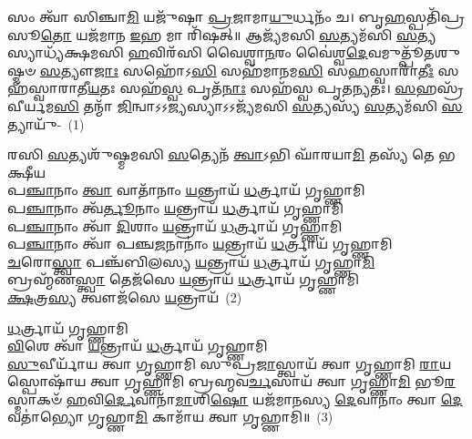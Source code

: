 {\anuvakamend[{𑌦𑌿\-\ul{𑌵𑌾} 𑌸 𑌸᳴\-\ul{𑌹}\-𑌸𑍍𑌰𑌿\-\ul{𑌣𑌂} 𑌵𑍈𑌶𑍍𑌵𑌾᳴𑌨𑌰𑌾\-𑌽\-𑌽𑌦𑌿\-\ul{𑌤𑍍𑌯} 𑌤𑍂 𑌨𑍋᳴\-𑌽\-\ul{𑌨𑍇}\-𑌹𑌸𑍞᳴ \ul{𑌸𑍁}\-𑌶𑌰𑍍𑌮𑌾᳴\-\ul{𑌣}\-𑌮𑍇\-\ul{𑌕𑌾}\-𑌨𑍍𑌨𑌵𑌿𑍞᳴\-\ul{𑌶}\-𑌤𑌿𑌶𑍍𑌚᳴}]}%

\setcounter{anuvakam}{0}
𑌸𑌂 𑌤𑍍𑌵𑌾᳴ 𑌸𑌿𑌞𑍍𑌚𑌾\-\ul{𑌮𑌿} 𑌯𑌜𑍁᳴𑌷𑌾 \ul{𑌪𑍍𑌰}\-𑌜𑌾𑌮𑌾\-\ul{𑌯𑍁}\-𑌰𑍍𑌧𑌨𑌂᳴ 𑌚। 𑌬𑍃\-\ul{𑌹}\-𑌸𑍍𑌪𑌤𑌿᳴𑌪𑍍𑌰𑌸𑍂\-\ul{𑌤𑍋} 𑌯𑌜᳴𑌮𑌾𑌨 \ul{𑌇}\-𑌹 𑌮𑌾 𑌰𑌿᳴𑌷𑌤𑍍॥ 𑌆𑌜𑍍𑌯᳴𑌮𑌸𑌿 \ul{𑌸}\-𑌤𑍍𑌯𑌮᳴𑌸𑌿 \ul{𑌸}\-𑌤𑍍𑌯𑌸𑍍𑌯𑌾𑌧𑍍𑌯᳴𑌕𑍍𑌷𑌮𑌸𑌿 \ul{𑌹}\-𑌵𑌿𑌰᳴𑌸𑌿 𑌵𑍈𑌶𑍍𑌵𑌾\-\ul{𑌨}\-𑌰𑌂 𑌵𑍈॑𑌶𑍍𑌵\-\ul{𑌦𑍇}\-𑌵𑌮𑍁𑌤𑍍𑌪𑍂᳴𑌤𑌶𑍁𑌷𑍍𑌮𑍞 \ul{𑌸}\-𑌤𑍍𑌯𑍗\-\ul{𑌜𑌾𑌃} 𑌸𑌹𑍋᳴\-𑌽\-\ul{𑌸𑌿} 𑌸𑌹᳴𑌮𑌾𑌨𑌮\-\ul{𑌸𑌿} 𑌸\-\ul{𑌹}\-𑌸𑍍𑌵𑌾𑌰𑌾᳴\-\ul{𑌤𑍀𑌃} 𑌸𑌹᳴𑌸𑍍𑌵𑌾𑌰𑌾𑌤𑍀\-\ul{𑌯}\-𑌤𑌃 𑌸𑌹᳴\-\ul{𑌸𑍍𑌵} 𑌪𑍃𑌤᳴\-\ul{𑌨𑌾𑌃} 𑌸𑌹᳴𑌸𑍍𑌵 𑌪𑍃𑌤\-\ul{𑌨𑍍𑌯}\-𑌤𑌃। \ul{𑌸}\-𑌹𑌸𑍍𑌰᳴𑌵𑍀𑌰𑍍𑌯𑌮\-\ul{𑌸𑌿} 𑌤𑌨𑍍𑌮𑌾᳴ \ul{𑌜𑌿}\-𑌨𑍍𑌵𑌾\-𑌽\-𑌽\-\ul{𑌜𑍍𑌯}\-𑌸𑍍𑌯𑌾\-𑌽\-𑌽𑌜𑍍𑌯᳴𑌮𑌸𑌿 \ul{𑌸}\-𑌤𑍍𑌯𑌸𑍍𑌯᳴ \ul{𑌸}\-𑌤𑍍𑌯𑌮᳴𑌸𑌿 \ul{𑌸}\-𑌤𑍍𑌯𑌾𑌯𑍁᳴-~(1)

𑌰𑌸𑌿 \ul{𑌸}\-𑌤𑍍𑌯𑌶𑍁᳴𑌷𑍍𑌮𑌮𑌸𑌿 \ul{𑌸}\-𑌤𑍍𑌯𑍇𑌨᳴ \ul{𑌤𑍍𑌵𑌾}\-\-𑌽𑌭𑌿 𑌘𑌾᳴𑌰𑌯𑌾\-\ul{𑌮𑌿} 𑌤𑌸𑍍𑌯᳴ 𑌤𑍇 𑌭𑌕𑍍𑌷𑍀𑌯\\
𑌪\-\ul{𑌞𑍍𑌚𑌾}\-𑌨𑌾𑌂 \ul{𑌤𑍍𑌵𑌾} 𑌵𑌾𑌤𑌾᳴𑌨𑌾𑌂 \ul{𑌯}\-𑌨𑍍𑌤𑍍𑌰𑌾𑌯᳴ \ul{𑌧}\-𑌰𑍍𑌤𑍍𑌰𑌾𑌯᳴ 𑌗𑍃𑌹𑍍𑌣𑌾𑌮𑌿\\
𑌪\-\ul{𑌞𑍍𑌚𑌾}\-𑌨𑌾𑌂 𑌤𑍍𑌵᳴\-\ul{𑌰𑍍𑌤𑍂}\-𑌨𑌾𑌂 \ul{𑌯}\-𑌨𑍍𑌤𑍍𑌰𑌾𑌯᳴ \ul{𑌧}\-𑌰𑍍𑌤𑍍𑌰𑌾𑌯᳴ 𑌗𑍃𑌹𑍍𑌣𑌾𑌮𑌿\\
𑌪\-\ul{𑌞𑍍𑌚𑌾}\-𑌨𑌾𑌂 𑌤𑍍𑌵𑌾᳴ \ul{𑌦𑌿}\-𑌶𑌾𑌂 \ul{𑌯}\-𑌨𑍍𑌤𑍍𑌰𑌾𑌯᳴ \ul{𑌧}\-𑌰𑍍𑌤𑍍𑌰𑌾𑌯᳴ 𑌗𑍃𑌹𑍍𑌣𑌾𑌮𑌿\\
𑌪\-\ul{𑌞𑍍𑌚𑌾}\-𑌨𑌾𑌂 𑌤𑍍𑌵𑌾᳴ 𑌪𑌞𑍍𑌚\-\ul{𑌜}\-𑌨𑌾𑌨𑌾𑌂॑ \ul{𑌯}\-𑌨𑍍𑌤𑍍𑌰𑌾𑌯᳴ \ul{𑌧}\-𑌰𑍍𑌤𑍍𑌰𑌾𑌯᳴ 𑌗𑍃𑌹𑍍𑌣𑌾𑌮𑌿\\
\-\ul{𑌚}\-𑌰𑍋\-\ul{𑌸𑍍𑌤𑍍𑌵𑌾} 𑌪𑌞𑍍𑌚᳴𑌬𑌿𑌲𑌸𑍍𑌯 \ul{𑌯}\-𑌨𑍍𑌤𑍍𑌰𑌾𑌯᳴ \ul{𑌧}\-𑌰𑍍𑌤𑍍𑌰𑌾𑌯᳴ 𑌗𑍃𑌹𑍍𑌣𑌾\-\ul{𑌮𑌿}\-\\
𑌬𑍍𑌰𑌹𑍍𑌮᳴𑌣\-\ul{𑌸𑍍𑌤𑍍𑌵𑌾} 𑌤𑍇𑌜᳴𑌸𑍇 \ul{𑌯}\-𑌨𑍍𑌤𑍍𑌰𑌾𑌯᳴ \ul{𑌧}\-𑌰𑍍𑌤𑍍𑌰𑌾𑌯᳴ 𑌗𑍃𑌹𑍍𑌣𑌾𑌮𑌿\\
\-\ul{𑌕𑍍𑌷}\-𑌤𑍍𑌰\-\ul{𑌸𑍍𑌯} 𑌤𑍍𑌵𑍗𑌜᳴𑌸𑍇 \ul{𑌯}\-𑌨𑍍𑌤𑍍𑌰𑌾𑌯᳴~(2)

\-\ul{𑌧}\-𑌰𑍍𑌤𑍍𑌰𑌾𑌯᳴ 𑌗𑍃𑌹𑍍𑌣𑌾𑌮𑌿\\
\-\ul{𑌵𑌿}\-𑌶𑍇 𑌤𑍍𑌵𑌾᳴ \ul{𑌯}\-𑌨𑍍𑌤𑍍𑌰𑌾𑌯᳴ \ul{𑌧}\-𑌰𑍍𑌤𑍍𑌰𑌾𑌯᳴ 𑌗𑍃𑌹𑍍𑌣𑌾𑌮𑌿\\
\-\ul{𑌸𑍁}\-𑌵𑍀𑌰𑍍𑌯𑌾᳴𑌯 𑌤𑍍𑌵𑌾 𑌗𑍃𑌹𑍍𑌣𑌾𑌮𑌿 𑌸𑍁𑌪𑍍𑌰\-\ul{𑌜𑌾}\-𑌸𑍍𑌤𑍍𑌵𑌾𑌯᳴ 𑌤𑍍𑌵𑌾 𑌗𑍃𑌹𑍍𑌣𑌾𑌮𑌿 \ul{𑌰𑌾}\-𑌯𑌸𑍍𑌪𑍋𑌷𑌾᳴𑌯 𑌤𑍍𑌵𑌾 𑌗𑍃𑌹𑍍𑌣𑌾𑌮𑌿 𑌬𑍍𑌰𑌹𑍍𑌮𑌵\-\ul{𑌰𑍍𑌚}\-𑌸𑌾𑌯᳴ 𑌤𑍍𑌵𑌾 𑌗𑍃𑌹𑍍𑌣𑌾\-\ul{𑌮𑌿} 𑌭𑍂\-\ul{𑌰}\-𑌸𑍍𑌮𑌾𑌕𑍞᳴ \ul{𑌹}\-𑌵𑌿\-\ul{𑌰𑍍𑌦𑍇}\-𑌵𑌾𑌨𑌾᳴\-\ul{𑌮𑌾}\-𑌶𑌿\-\ul{𑌷𑍋} 𑌯𑌜᳴𑌮𑌾𑌨𑌸𑍍𑌯 \ul{𑌦𑍇}\-𑌵𑌾𑌨𑌾𑌂॑ 𑌤𑍍𑌵𑌾 \ul{𑌦𑍇}\-𑌵𑌤𑌾॑𑌭𑍍𑌯𑍋 𑌗𑍃𑌹𑍍𑌣𑌾\-\ul{𑌮𑌿} 𑌕𑌾𑌮𑌾᳴𑌯 𑌤𑍍𑌵𑌾 𑌗𑍃𑌹𑍍𑌣𑌾𑌮𑌿॥~(3)

{\anuvakamend[{\-\ul{𑌸}\-𑌤𑍍𑌯𑌾\-\ul{𑌯𑍁}\-𑌰𑍋𑌜᳴𑌸𑍇 \ul{𑌯}\-𑌨𑍍𑌤𑍍𑌰𑌾\-\ul{𑌯} 𑌤𑍍𑌰𑌯᳴𑌸𑍍𑌤𑍍𑌰𑌿𑍞𑌶𑌚𑍍𑌚}]}%

